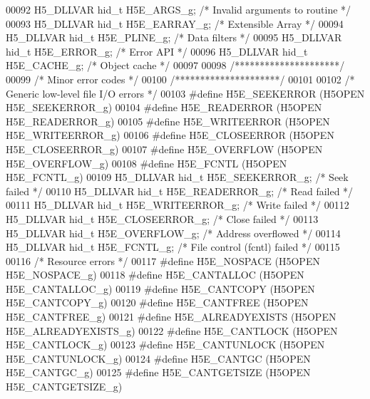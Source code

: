 \begin{DoxyCode}
00092 H5\_DLLVAR hid\_t H5E\_ARGS\_g;          \textcolor{comment}{/* Invalid arguments to routine */}
00093 H5\_DLLVAR hid\_t H5E\_EARRAY\_g;        \textcolor{comment}{/* Extensible Array */}
00094 H5\_DLLVAR hid\_t H5E\_PLINE\_g;         \textcolor{comment}{/* Data filters */}
00095 H5\_DLLVAR hid\_t H5E\_ERROR\_g;         \textcolor{comment}{/* Error API */}
00096 H5\_DLLVAR hid\_t H5E\_CACHE\_g;         \textcolor{comment}{/* Object cache */}
00097 
00098 \textcolor{comment}{/*********************/}
00099 \textcolor{comment}{/* Minor error codes */}
00100 \textcolor{comment}{/*********************/}
00101 
00102 \textcolor{comment}{/* Generic low-level file I/O errors */}
00103 \textcolor{preprocessor}{#define H5E\_SEEKERROR        (H5OPEN H5E\_SEEKERROR\_g)}
00104 \textcolor{preprocessor}{#define H5E\_READERROR        (H5OPEN H5E\_READERROR\_g)}
00105 \textcolor{preprocessor}{#define H5E\_WRITEERROR       (H5OPEN H5E\_WRITEERROR\_g)}
00106 \textcolor{preprocessor}{#define H5E\_CLOSEERROR       (H5OPEN H5E\_CLOSEERROR\_g)}
00107 \textcolor{preprocessor}{#define H5E\_OVERFLOW         (H5OPEN H5E\_OVERFLOW\_g)}
00108 \textcolor{preprocessor}{#define H5E\_FCNTL            (H5OPEN H5E\_FCNTL\_g)}
00109 H5\_DLLVAR hid\_t H5E\_SEEKERROR\_g;     \textcolor{comment}{/* Seek failed */}
00110 H5\_DLLVAR hid\_t H5E\_READERROR\_g;     \textcolor{comment}{/* Read failed */}
00111 H5\_DLLVAR hid\_t H5E\_WRITEERROR\_g;    \textcolor{comment}{/* Write failed */}
00112 H5\_DLLVAR hid\_t H5E\_CLOSEERROR\_g;    \textcolor{comment}{/* Close failed */}
00113 H5\_DLLVAR hid\_t H5E\_OVERFLOW\_g;      \textcolor{comment}{/* Address overflowed */}
00114 H5\_DLLVAR hid\_t H5E\_FCNTL\_g;         \textcolor{comment}{/* File control (fcntl) failed */}
00115 
00116 \textcolor{comment}{/* Resource errors */}
00117 \textcolor{preprocessor}{#define H5E\_NOSPACE          (H5OPEN H5E\_NOSPACE\_g)}
00118 \textcolor{preprocessor}{#define H5E\_CANTALLOC        (H5OPEN H5E\_CANTALLOC\_g)}
00119 \textcolor{preprocessor}{#define H5E\_CANTCOPY         (H5OPEN H5E\_CANTCOPY\_g)}
00120 \textcolor{preprocessor}{#define H5E\_CANTFREE         (H5OPEN H5E\_CANTFREE\_g)}
00121 \textcolor{preprocessor}{#define H5E\_ALREADYEXISTS    (H5OPEN H5E\_ALREADYEXISTS\_g)}
00122 \textcolor{preprocessor}{#define H5E\_CANTLOCK         (H5OPEN H5E\_CANTLOCK\_g)}
00123 \textcolor{preprocessor}{#define H5E\_CANTUNLOCK       (H5OPEN H5E\_CANTUNLOCK\_g)}
00124 \textcolor{preprocessor}{#define H5E\_CANTGC           (H5OPEN H5E\_CANTGC\_g)}
00125 \textcolor{preprocessor}{#define H5E\_CANTGETSIZE      (H5OPEN H5E\_CANTGETSIZE\_g)}

\end{DoxyCode}
